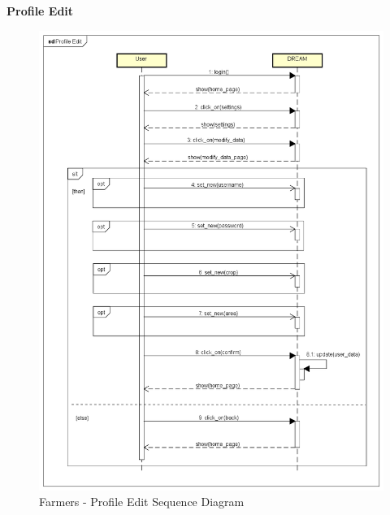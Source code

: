 \documentclass[table, 12pt]{article}
\begin{document}
\begin{itemize}
            \textbf{Profile Edit}
            \begin{center}
                \begin{figure}[H]
                    \includegraphics[scale=0.4, center]{assets/Sequence diagrams/Farmer/Profile Edit.png}
                    \caption{Farmers - Profile Edit Sequence Diagram}
                    \label{fig: sequence_editprofile}
                \end{figure}
            \end{center}
            

\end{itemize}
\end{document}
